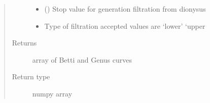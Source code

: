 \documentclass[letterpaper,10pt,english]{sphinxmanual}
\begin{document}
\begin{fulllineitems}
\begin{quote}
\begin{description}
\begin{itemize}
\item {} 
\sphinxAtStartPar
{} () \textendash{} Stop value for generation filtration from dionysus

\item {} 
\sphinxAtStartPar
{} \textendash{} Type of filtration accepted values are ‘lower’ ‘upper

\end{itemize}

\item[{Returns}] \leavevmode
\sphinxAtStartPar
array of Betti and Genus curves

\item[{Return type}] \leavevmode
\sphinxAtStartPar
numpy array

\end{description}\end{quote}

\end{fulllineitems}

\end{document}
